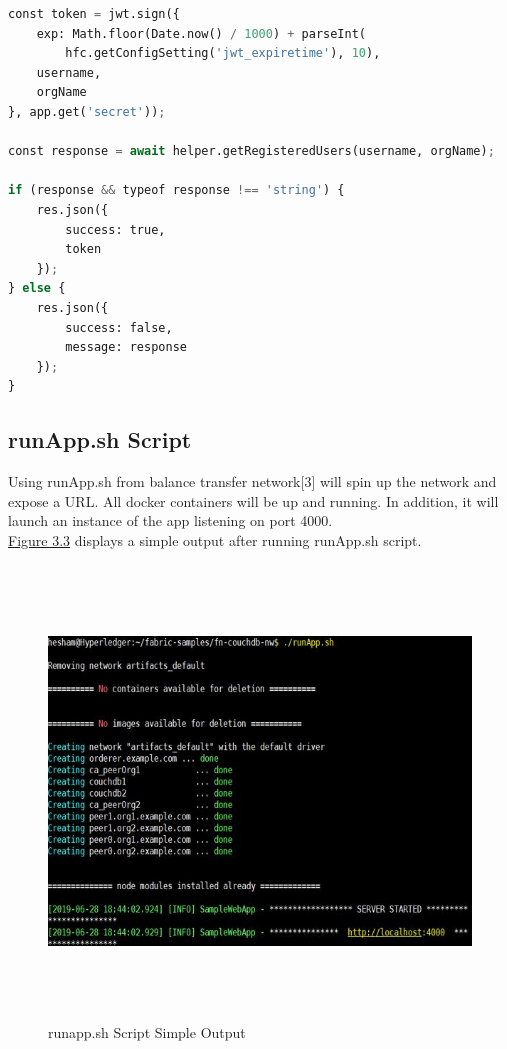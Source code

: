 \begin{lstlisting}[language=Python, caption=JWT Generation,captionpos=b]
const token = jwt.sign({
    exp: Math.floor(Date.now() / 1000) + parseInt(
        hfc.getConfigSetting('jwt_expiretime'), 10),
    username,
    orgName
}, app.get('secret'));

const response = await helper.getRegisteredUsers(username, orgName);

if (response && typeof response !== 'string') {
    res.json({
        success: true,
        token
    });
} else {
    res.json({
        success: false,
        message: response
    });
}
\end{lstlisting}
\cleardoublepage


\subsection{runApp.sh Script }
Using runApp.sh from balance transfer network[3] will spin up the network and expose a URL. All docker containers will be up and running. In addition, it will launch an instance of the app listening on port 4000. \\
\hyperref[fig:runapp]{Figure 3.3} displays a simple output after running runApp.sh script. 
\ \\
 \begin{figure}[H]
\includegraphics[width=15cm,height=12cm]{images/runapp.jpg}
\caption{runapp.sh Script Simple Output}
\label{fig:runapp}
\end{figure}


